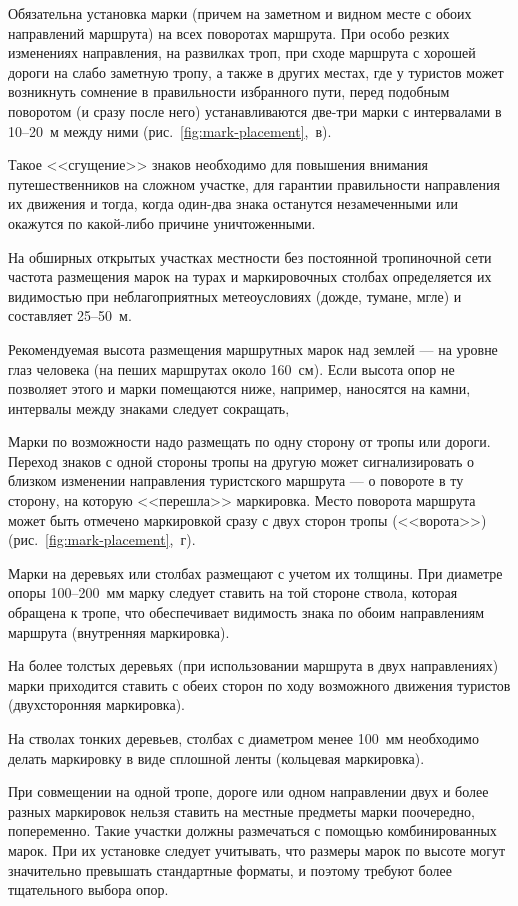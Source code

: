 \documentclass[a4paper,12pt,titlepage]{extarticle}
\begin{document}
Обязательна установка марки (причем на заметном и видном месте с обоих направлений маршрута) на всех поворотах маршрута.
При особо резких изменениях направления, на развилках троп, при сходе маршрута с хорошей дороги на слабо заметную тропу,
а также в других местах, где у туристов может возникнуть сомнение в правильности избранного пути, перед подобным
поворотом (и сразу после него) устанавливаются две-три марки с интервалами в 10--20~м между ними (рис.~\ref{fig:mark-placement},~в).

Такое <<сгущение>> знаков необходимо для повышения внимания путешественников на сложном участке, для гарантии правильности
направления их движения и тогда, когда один-два знака останутся незамеченными или окажутся по какой-либо причине
уничтоженными.

На обширных открытых участках местности без постоянной тропиночной сети частота размещения марок на турах и
маркировочных столбах определяется их видимостью при неблагоприятных метеоусловиях (дожде, тумане, мгле) и составляет
25--50~м.

Рекомендуемая высота размещения маршрутных марок над землей --- на уровне глаз человека (на пеших маршрутах около 160~см).
Если высота опор не позволяет этого и марки помещаются ниже, например, наносятся на камни, интервалы между знаками
следует сокращать,

Марки по возможности надо размещать по одну сторону от тропы или дороги. Переход знаков с одной стороны тропы на другую
может сигнализировать о близком изменении направления туристского маршрута --- о повороте в ту сторону, на которую
<<перешла>> маркировка. Место поворота маршрута может быть отмечено маркировкой сразу с двух сторон тропы (<<ворота>>) (рис.~\ref{fig:mark-placement},~г).

Марки на деревьях или столбах размещают с учетом их толщины. При диаметре опоры 100--200~мм марку следует ставить на той
стороне ствола, которая обращена к тропе, что обеспечивает видимость знака по обоим направлениям маршрута (внутренняя
маркировка).

На более толстых деревьях (при использовании маршрута в двух направлениях) марки приходится ставить с обеих сторон по
ходу возможного движения туристов (двухсторонняя маркировка).

На стволах тонких деревьев, столбах с диаметром менее 100~мм необходимо делать маркировку в виде сплошной ленты
(кольцевая маркировка).

При совмещении на одной тропе, дороге или одном направлении двух и более разных маркировок нельзя ставить на местные
предметы марки поочередно, попеременно. Такие участки должны размечаться с помощью комбинированных марок. При их
установке следует учитывать, что размеры марок по высоте могут значительно превышать стандартные форматы, и поэтому
требуют более тщательного выбора опор.
\end{document}
